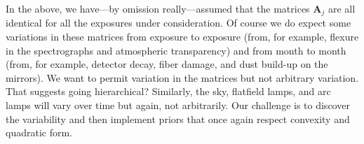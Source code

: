 \documentclass[12pt]{article}
\newcommand{\hmatrix}[1]{\boldsymbol{#1}}
\newcommand{\Amatrix}{\hmatrix{A}}
\begin{document}
In the above, we have---by omission really---assumed that the matrices
$\Amatrix_j$ are all identical for all the exposures under
consideration.  Of course we do expect some variations in these
matrices from exposure to exposure (from, for example, flexure in the
spectrographs and atmospheric transparency) and from month to month
(from, for example, detector decay, fiber damage, and dust build-up on
the mirrors).  We want to permit variation in the matrices but not
arbitrary variation.  That suggests going hierarchical?  Similarly,
the sky, flatfield lamps, and arc lamps will vary over time but again,
not arbitrarily.  Our challenge is to discover the variability and
then implement priors that once again respect convexity and quadratic
form.
\end{document}
